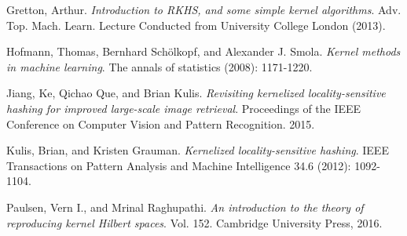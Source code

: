 \documentclass[twoside,11pt]{homework}
\begin{document}
\begin{multicols}{2}
\begin{thebibliography}{9}
 Gretton, Arthur. \emph{Introduction to RKHS, and some simple kernel algorithms}. Adv. Top. Mach. Learn. Lecture Conducted from University College London (2013).

 Hofmann, Thomas, Bernhard Schölkopf, and Alexander J. Smola. \emph{Kernel methods in machine learning}. The annals of statistics (2008): 1171-1220.

 Jiang, Ke, Qichao Que, and Brian Kulis. \emph{Revisiting kernelized locality-sensitive hashing for improved large-scale image retrieval}. Proceedings of the IEEE Conference on Computer Vision and Pattern Recognition. 2015.
  
 Kulis, Brian, and Kristen Grauman. \emph{Kernelized locality-sensitive hashing}. IEEE Transactions on Pattern Analysis and Machine Intelligence 34.6 (2012): 1092-1104.

 Paulsen, Vern I., and Mrinal Raghupathi. \emph{An introduction to the theory of reproducing kernel Hilbert spaces}. Vol. 152. Cambridge University Press, 2016. 

\end{thebibliography}

\end{multicols}
\end{document}
